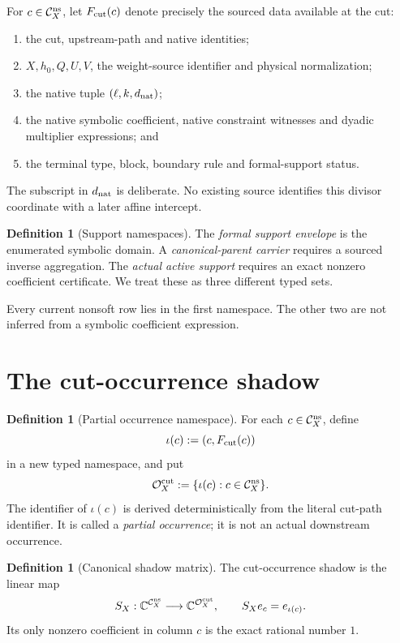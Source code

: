 \documentclass[11pt]{article}
\theoremstyle{definition}
\newtheorem{definition}[theorem]{Definition}
\theoremstyle{remark}
\newcommand{\Cns}{\mathcal C_X^{\rm ns}}
\newcommand{\Ocut}{\mathcal O_X^{\rm cut}}
\begin{document}
For \(c\in\Cns\), let \(F_{\rm cut}(c)\) denote precisely the sourced
data available at the cut:
\begin{enumerate}[label=(\roman*),leftmargin=2.2em]
\item the cut, upstream-path and native identities;
\item \(X,h_0,Q,U,V\), the weight-source identifier and physical
normalization;
\item the native tuple \((\ell,k,d_{\rm nat})\);
\item the native symbolic coefficient, native constraint witnesses
and dyadic multiplier expressions; and
\item the terminal type, block, boundary rule and formal-support
status.
\end{enumerate}
The subscript in \(d_{\rm nat}\) is deliberate.  No existing source
identifies this divisor coordinate with a later affine intercept.

\begin{definition}[Support namespaces]
The \emph{formal support envelope} is the enumerated symbolic domain.
A \emph{canonical-parent carrier} requires a sourced inverse
aggregation.  The \emph{actual active support} requires an exact
nonzero coefficient certificate.  We treat these as three different
typed sets.
\end{definition}

Every current nonsoft row lies in the first namespace.  The other two
are not inferred from a symbolic coefficient expression.

\section{The cut-occurrence shadow}

\begin{definition}[Partial occurrence namespace]
For each \(c\in\Cns\), define
\[
 \iota(c):=(c,F_{\rm cut}(c))
\]
in a new typed namespace, and put
\[
 \Ocut:=\{\iota(c):c\in\Cns\}.
\]
The identifier of \(\iota(c)\) is derived deterministically from the
literal cut-path identifier.  It is called a \emph{partial
occurrence}; it is not an actual downstream occurrence.
\end{definition}

\begin{definition}[Canonical shadow matrix]
The cut-occurrence shadow is the linear map
\begin{equation}
 S_X:\mathbb C^{\Cns}\longrightarrow\mathbb C^{\Ocut},
 \qquad S_Xe_c=e_{\iota(c)}.
 \label{eq:shadow}
\end{equation}
Its only nonzero coefficient in column \(c\) is the exact rational
number \(1\).
\end{definition}
\end{document}

